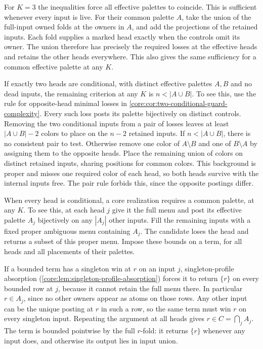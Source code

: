 For $K=3$ the inequalities force all effective palettes
to coincide. This is sufficient whenever every input is
live. For their common palette $A$, take the union of the
full-input owned folds at the owners in $A$, and add the
projections of the retained inputs. Each fold supplies a
marked head exactly when the controls omit its owner.
The union therefore has precisely the required losses at
the effective heads and retains the other heads everywhere.
This also gives the same sufficiency for a common effective
palette at any $K$.

If exactly two heads are conditional, with distinct effective
palettes $A,B$ and no dead inputs, the remaining criterion
at any $K$ is $n<|A\cup B|$. To see this, use the rule for
opposite-head minimal losses in
\cref{core:cor:two-conditional-guard-complexity}. Every such
loss posts its palette bijectively on distinct controls.
Removing the two conditional inputs from a pair of losses
leaves at least $|A\cup B|-2$ colors to place on the $n-2$
retained inputs. If $n<|A\cup B|$, there is no consistent
pair to test. Otherwise remove one color of $A\setminus B$
and one of $B\setminus A$ by assigning them to the opposite
heads. Place the remaining union of colors on distinct
retained inputs, sharing positions for common colors.
This background is proper and misses one required color of
each head, so both heads survive with the internal inputs free.
The pair rule forbids this, since the opposite postings differ.

When every head is conditional, a core realization requires
a common palette, at any $K$. To see this, at each head $j$
give it the full menu and post its effective palette $A_j$
bijectively on any $|A_j|$ other inputs. Fill the remaining
inputs with a fixed proper ambiguous menu containing $A_j$.
The candidate loses the head and returns a subset of this
proper menu. Impose these bounds on a term, for all heads and
all placements of their palettes.

If a bounded term has a singleton win at $r$ on an input
$j$, singleton-profile absorption
(\cref{core:lem:singleton-profile-absorption}) forces it to
return $\{r\}$ on every bounded row at $j$, because it cannot
retain the full menu there. In particular $r\in A_j$,
since no other owners appear as atoms on those rows. Any
other input can be the unique posting at $r$ in such a row,
so the same term must win $r$ on every singleton input.
Repeating the argument at all heads gives
$r\in C=\bigcap_j A_j$. The term is bounded pointwise by
the full $r$-fold: it returns $\{r\}$ whenever any input
does, and otherwise its output lies in input union.

